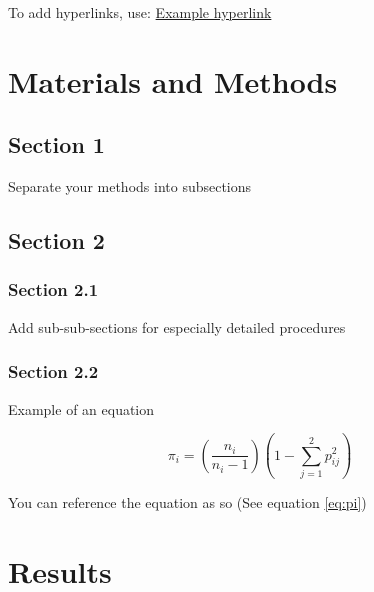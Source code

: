 \documentclass[10pt,letterpaper]{article}
\begin{document}
To add hyperlinks, use: \href{https://www.overleaf.com/learn}{Example hyperlink}

\section*{Materials and Methods}

\subsection*{Section 1}

Separate your methods into subsections

\subsection*{Section 2}

\subsubsection*{Section 2.1}

Add sub-sub-sections for especially detailed procedures

\subsubsection*{Section 2.2}

Example of an equation

\begin{equation}
\pi_i = \left( \frac{n_i}{n_i-1} \right) \left( 1 - \sum_{j = 1}^{2} p_{ij}^2 \right)
\label{eq:pi}
\end{equation}

You can reference the equation as so (See equation \ref{eq:pi})

\section*{Results}
\end{document}
